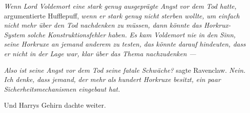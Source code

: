 \emph{Wenn Lord Voldemort eine stark genug ausgeprägte Angst vor dem Tod hatte,} argumentierte Hufflepuff, \emph{wenn er stark genug nicht sterben wollte, um einfach nicht mehr über den Tod nachdenken zu müssen, dann könnte das Horkrux-System solche Konstruktionsfehler haben. Es kam Voldemort nie in den Sinn, seine Horkruxe an jemand anderem zu testen, das könnte darauf hindeuten, dass er nicht in der Lage war, klar über das Thema nachzudenken —}

\emph{Also ist seine Angst vor dem Tod seine fatale Schwäche?} sagte Ravenclaw. \emph{Nein. Ich denke, dass jemand, der mehr als hundert Horkruxe besitzt, ein paar Sicherheitsmechanismen eingebaut hat.}

Und Harrys Gehirn dachte weiter.

